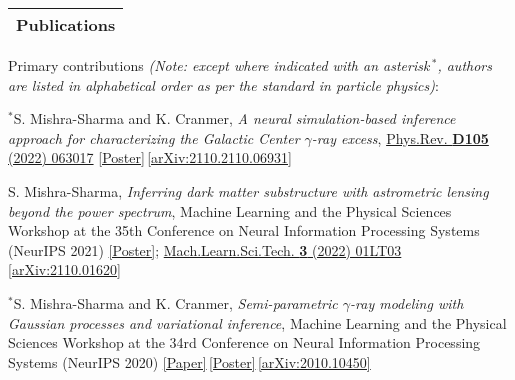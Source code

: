 \documentclass[letterpaper,11pt]{article}
\newenvironment{packed_enumerate}[1][]{
\begin{etaremune}[#1]
  \setlength{\itemsep}{3.9pt}
  \setlength{\parskip}{0pt}
  \setlength{\parsep}{0pt}}{\end{etaremune}
}
\begin{document}

\newpage


\noindent
\begin{tabular*}{\textwidth}{l@{\extracolsep{\fill}}}
\large {\sc \Large{Publications}}\\
\hline
\end{tabular*}\vspace{3.5mm}

\noindent
Primary contributions \emph{(Note: except where indicated with an asterisk\,$^*$, authors are listed in alphabetical order as per the standard in particle physics)}:

\begin{packed_enumerate}[start=26]
  \item  $^*$S. Mishra-Sharma and K. Cranmer, \emph{A neural simulation-based inference approach for characterizing the Galactic Center $\gamma$-ray excess}, \href{https://journals.aps.org/prd/abstract/10.1103/PhysRevD.105.063017}{Phys.Rev. \textbf{D105} (2022) 063017}  \href{https://ml4physicalsciences.github.io/2021/files/NeurIPS_ML4PS_2021_69_poster.png}{[Poster]}\,\href{https://arxiv.org/abs/2110.2110.06931}{[arXiv:2110.2110.06931]}


  \item S. Mishra-Sharma, \emph{Inferring dark matter substructure with astrometric lensing beyond the power spectrum},  {Machine Learning and the Physical Sciences Workshop at the 35th Conference on Neural Information Processing Systems (NeurIPS 2021)} \href{https://ml4physicalsciences.github.io/2021/files/NeurIPS_ML4PS_2021_22_poster.png}{[Poster]};  \href{https://doi.org/10.1088/2632-2153/ac494a}{Mach.Learn.Sci.Tech. \textbf{3} (2022) 01LT03} \,\href{https://arxiv.org/abs/2110.01620}{[arXiv:2110.01620]}

  \item $^*$S. Mishra-Sharma and K. Cranmer, \emph{Semi-parametric $\gamma$-ray modeling with Gaussian processes and variational inference}, {Machine Learning and the Physical Sciences Workshop at the 34rd Conference on Neural Information Processing Systems (NeurIPS 2020)} \href{https://ml4physicalsciences.github.io/2020/files/NeurIPS_ML4PS_2020_20.pdf}{[Paper]}\,\href{https://ml4physicalsciences.github.io/2020/files/NeurIPS_ML4PS_2020_20_poster.pdf}{[Poster]}\,\href{https://arxiv.org/abs/2010.10450}{[arXiv:2010.10450]} 


\end{packed_enumerate}
\end{document}
